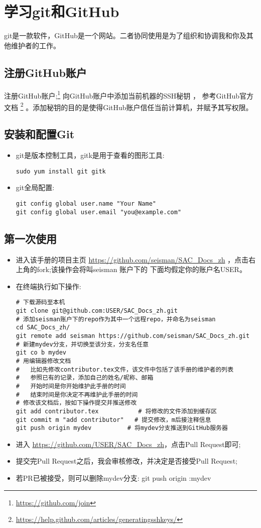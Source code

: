 \section{学习git和GitHub}
git是一款软件，GitHub是一个网站。二者协同使用是为了组织和协调我和你及其他维护者的工作。
\subsection{注册GitHub账户}
注册GitHub账户;\footnote{\url{https://github.com/join}}
向GitHub账户中添加当前机器的SSH秘钥 ， 参考GitHub官方文档
\footnote{\url{https://help.github.com/articles/generating­ssh­keys/}}
。添加秘钥的目的是使得GitHub账户信任当前计算机，并赋予其写权限。
\subsection{安装和配置Git}
\begin{itemize}
\item git是版本控制工具，gitk是用于查看的图形工具:
\begin{verbatim}
sudo yum install git gitk
\end{verbatim}
\item git全局配置:
\begin{verbatim}
git config ­­global user.name "Your Name"
git config ­­global user.email "you@example.com"
\end{verbatim}
\end{itemize}
\subsection{第一次使用}
\begin{itemize}
\item 进入该手册的项目主页 \url{https://github.com/seisman/SAC_Docs_zh}
，点击右上角的fork;该操作会将叫seisman 账户下的 %
下面均假定你的账户名USER。
\item 在终端执行如下操作:
\begin{verbatim}
# 下载源码至本机
git clone git@github.com:USER/SAC_Docs_zh.git
# 添加seisman账户下的repo作为其中一个远程repo，并命名为seisman
cd SAC_Docs_zh/
git remote add seisman https://github.com/seisman/SAC_Docs_zh.git
# 新建mydev分支，并切换至该分支，分支名任意
git co ­b mydev
# 用编辑器修改文档
#   比如先修改contributor.tex文件，该文件中包括了该手册的维护者的列表
#   参照已有的记录，添加自己的姓名/昵称、邮箱
#   开始时间是你开始维护此手册的时间
#   结束时间是你决定不再维护此手册的时间
# 修改该文档后，按如下操作提交并推送修改
git add contributor.tex           # 将修改的文件添加到缓存区
git commit ­m "add contributor"   # 提交修改，­m后接注释信息
git push origin mydev          # 将mydev分支推送到GitHub服务器
\end{verbatim}
\item 进入 \url{https://github.com/USER/SAC_Docs_zh}，点击Pull Request即可;
\item 提交完Pull Request之后，我会审核修改，并决定是否接受Pull Request;
\item 若PR已被接受，则可以删除mydev分支:
git push origin :mydev
\end{itemize}
